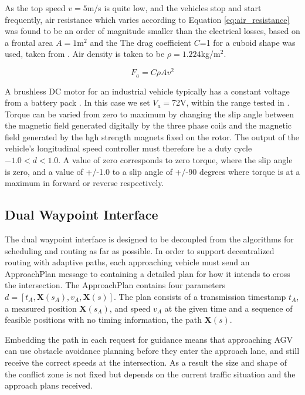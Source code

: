 As the top speed $v=5$m/s is quite low, and the vehicles stop and start frequently, air resistance which varies according to Equation \ref{eq:air_resistance} was found to be an order of magnitude smaller than the electrical losses, based on a frontal area $A=1$m$^2$ and the The drag coefficient $C$=1 for a cuboid shape was used, taken from \cite{Toolbox2004}. Air density is taken to be $\rho=1.224$kg/m$^2$.

\begin{equation}
F_a = C\rho A v^2 
\label{eq:air_resistance}
\end{equation}

A brushless DC motor for an industrial vehicle typically has a constant voltage from a battery pack \cite{Hyster2020a}. In this case we set $V_a=$72V, within the range tested in \cite{Racewicz2018}. Torque can be varied from zero to maximum by changing the slip angle between the magnetic field generated digitally by the three phase coils and the magnetic field generated by the hgh strength magnets fixed on  the rotor. The output of the vehicle's longitudinal speed controller must therefore be a duty cycle $-1.0<d<1.0$. A value of zero corresponds to zero torque, where the slip angle is zero, and a value of +/-1.0 to a slip angle of +/-90 degrees where torque is at a maximum in forward or reverse respectively.

\subsection{Dual Waypoint Interface}
\label{sec:dual_waypoint}
The dual waypoint interface is designed to be decoupled from the algorithms for scheduling and routing as far as possible. In order to support decentralized routing with adaptive paths, each approaching vehicle must send an ApproachPlan message to containing a detailed plan for how it intends to cross the intersection.  The ApproachPlan contains four parameters $d =\left[ t_A, \bm{X}( s_A ), v_A, \bm{X}(s) \right]$. The plan consists of a transmission timestamp $t_A$, a measured position $\bm{X}(s_A)$, and speed $v_A$ at the given time and a sequence of feasible positions with no timing information, the path $\bm{X}(s)$. 

Embedding the path in each request for guidance means that approaching AGV can use obstacle avoidance planning before they enter the approach lane, and still receive the correct speeds at the intersection. As a result the size and shape of the conflict zone is not fixed but depends on the current traffic situation and the approach plans received.

